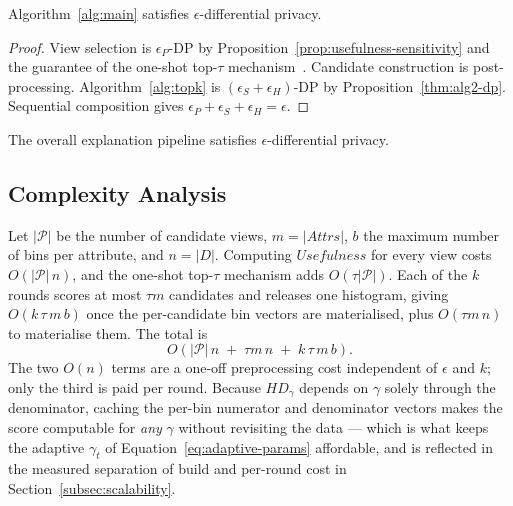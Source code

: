 \begin{proposition}
\label{thm:alg1-dp}
Algorithm~\ref{alg:main} satisfies $\epsilon$-differential privacy.
\end{proposition}

\begin{proof}
View selection is $\epsilon_P$-DP by Proposition~\ref{prop:usefulness-sensitivity} and the guarantee of the one-shot top-$\tau$ mechanism~\cite{TaoGMR22}.
Candidate construction is post-processing.
Algorithm~\ref{alg:topk} is $(\epsilon_S+\epsilon_H)$-DP by Proposition~\ref{thm:alg2-dp}.
Sequential composition gives $\epsilon_P+\epsilon_S+\epsilon_H=\epsilon$.
\end{proof}

\begin{corollary}
\label{cor:end-to-end-dp}
The overall explanation pipeline satisfies $\epsilon$-differential privacy.
\end{corollary}

\subsection{Complexity Analysis}
\label{subsec:complexity-analysis}

Let $|\mathcal{P}|$ be the number of candidate views, $m=|Attrs|$, $b$ the maximum number of bins per attribute, and $n=|D|$.
Computing $Usefulness$ for every view costs $O(|\mathcal{P}|\,n)$, and the one-shot top-$\tau$ mechanism adds $O(\tau|\mathcal{P}|)$.
Each of the $k$ rounds scores at most $\tau m$ candidates and releases one histogram, giving $O(k\,\tau\,m\,b)$ once the per-candidate bin vectors are materialised, plus $O(\tau m\, n)$ to materialise them.
The total is
\[
O\!\left(|\mathcal{P}|\,n \;+\; \tau m\, n \;+\; k\,\tau\,m\,b\right).
\]
The two $O(n)$ terms are a one-off preprocessing cost independent of $\epsilon$ and $k$; only the third is paid per round.
Because $HD_\gamma$ depends on $\gamma$ solely through the denominator, caching the per-bin numerator and denominator vectors makes the score computable for \emph{any} $\gamma$ without revisiting the data --- which is what keeps the adaptive $\gamma_t$ of Equation~\eqref{eq:adaptive-params} affordable, and is reflected in the measured separation of build and per-round cost in Section~\ref{subsec:scalability}.
